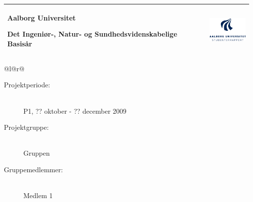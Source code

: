 \documentclass[11pt]{article}
\begin{document}
 
\thispagestyle{empty}

\newlength{\realparindent}
\newlength{\realparskip}
\setlength{\realparindent}{\parindent}
\setlength{\realparskip}{\parskip}

\begin{titlepage}
\begin{nopagebreak}
{
\begin{center}
    \samepage
    \begin{tabular*}{\textwidth}{@{} l @{\extracolsep{\fill}}r@{}}
        \parbox[b]{11cm}{
            {\LARGE Aalborg Universitet}
            
            {\large Det Ingeniør-, Natur- og Sundhedsvidenskabelige Basisår}
        }
        & \includegraphics[width=2cm]{images/aaulogo.png} \\
        \hline
    \end{tabular*}
    \vspace{0.4cm}

    \begin{tabular*}{\textwidth}{@{}l@{\extracolsep{\fill}}r@{}}
        \\
        \begin{minipage}[t]{0.49\textwidth}
            \begin{description}
                \item[Projektperiode:]~\\
                P1, ?? oktober - ?? december 2009
                \vspace{0.2cm}

                \item[Projektgruppe:]~\\
                Gruppen
                  
                \item[Gruppemedlemmer:]~\\
                Medlem 1 


\end{description}
\end{minipage}
\end{tabular*}
\end{center}}
\end{nopagebreak}
\end{titlepage}
\end{document}
